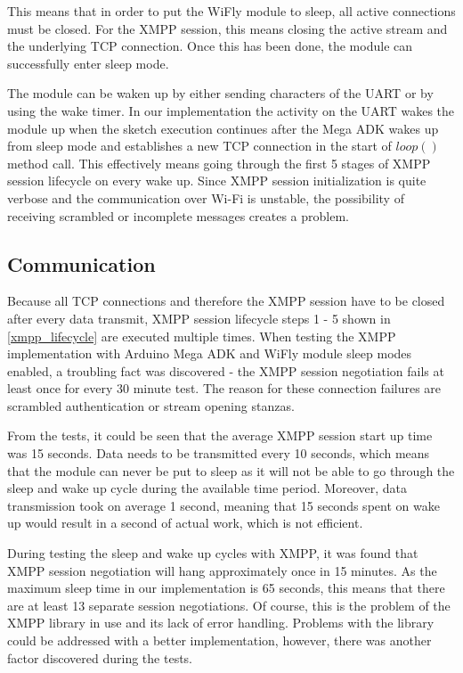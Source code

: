 This means that in order to put the WiFly module to sleep, all active connections must be closed. For the XMPP session, this means closing the active stream and the underlying TCP connection. Once this has been done, the module can successfully enter sleep mode. 

The module can be waken up by either sending characters of the UART or by using the wake timer. In our implementation the activity on the UART wakes the module up when the sketch execution continues after the Mega ADK wakes up from sleep mode and establishes a new TCP connection in the start of $loop()$ method call. This effectively means going through the first 5 stages of XMPP session lifecycle on every wake up. 
Since XMPP session initialization is quite verbose and the communication over Wi-Fi is unstable, the possibility of receiving scrambled or incomplete messages creates a problem. 

\subsection{Communication}

Because all TCP connections and therefore the XMPP session have to be closed after every data transmit, XMPP session lifecycle steps 1 - 5 shown in \autoref{xmpp_lifecycle} are executed multiple times. When testing the XMPP implementation with Arduino Mega ADK and WiFly module sleep modes enabled, a troubling fact was discovered - the XMPP session negotiation fails at least once for every 30 minute test. The reason for these connection failures are scrambled authentication or stream opening stanzas. 

From the tests, it could be seen that the average XMPP session start up time was 15 seconds. Data needs to be transmitted every 10 seconds, which means that the module can never be put to sleep as it will not be able to go through the sleep and wake up cycle during the available time period. Moreover, data transmission took on average 1 second, meaning that 15 seconds spent on wake up would result in a second of actual work, which is not efficient. 

During testing the sleep and wake up cycles with XMPP, it was found that XMPP session negotiation will hang approximately once in 15 minutes. As the maximum sleep time in our implementation is 65 seconds, this means that there are at least 13 separate session negotiations. Of course, this is the problem of the XMPP library in use and its lack of error handling. Problems with the library could be addressed with a better implementation, however, there was another factor discovered during the tests.

